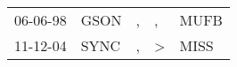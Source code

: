 \begin{supertabular}{lllll}
 06-06-98 &  GSON &  , &             , &  MUFB \\
 11-12-04 &  SYNC &  , &  \textgreater &  MISS \\
\end{supertabular}
